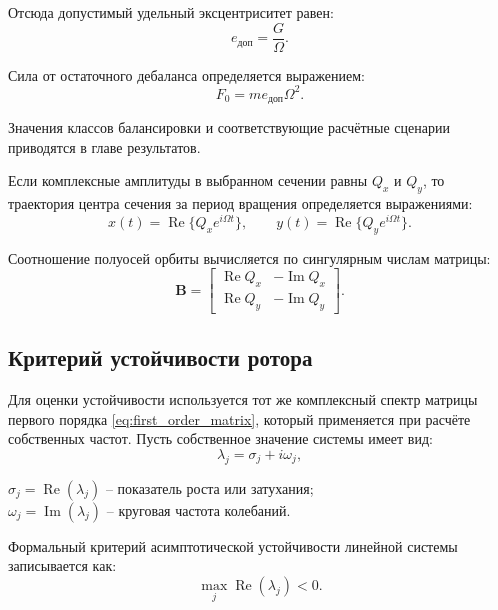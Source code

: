 Отсюда допустимый удельный эксцентриситет равен:
\begin{equation}
    e_{\text{доп}}=\frac{G}{\Omega}.
    \label{eq:balance_eccentricity}
\end{equation}

Сила от остаточного дебаланса определяется выражением:
\begin{equation}
    F_0=m e_{\text{доп}}\Omega^2.
    \label{eq:unbalance_force}
\end{equation}

Значения классов балансировки и соответствующие расчётные сценарии приводятся в главе результатов.

Если комплексные амплитуды в выбранном сечении равны $Q_x$ и $Q_y$, то траектория центра сечения за период вращения определяется выражениями:
\begin{equation}
    x(t)=\operatorname{Re}\{Q_x e^{i\Omega t}\},\qquad
    y(t)=\operatorname{Re}\{Q_y e^{i\Omega t}\}.
    \label{eq:orbit_equations}
\end{equation}

Соотношение полуосей орбиты вычисляется по сингулярным числам матрицы:
\begin{equation}
    \mathbf{B}=\begin{bmatrix}
    \operatorname{Re}Q_x&-\operatorname{Im}Q_x\\
    \operatorname{Re}Q_y&-\operatorname{Im}Q_y
    \end{bmatrix}.
    \label{eq:ellipse_axes}
\end{equation}

\subsection{Критерий устойчивости ротора}

Для оценки устойчивости используется тот же комплексный спектр матрицы первого порядка \eqref{eq:first_order_matrix}, который применяется при расчёте собственных частот. Пусть собственное значение системы имеет вид:
\begin{equation}
    \lambda_j=\sigma_j+i\omega_j,
\end{equation}
\begin{conditions}
$\sigma_j=\operatorname{Re}(\lambda_j)$ -- показатель роста или затухания;\\
$\omega_j=\operatorname{Im}(\lambda_j)$ -- круговая частота колебаний.
\end{conditions}

Формальный критерий асимптотической устойчивости линейной системы записывается как:
\begin{equation}
    \max_j \operatorname{Re}(\lambda_j)<0.
    \label{eq:stability_real_part}
\end{equation}

